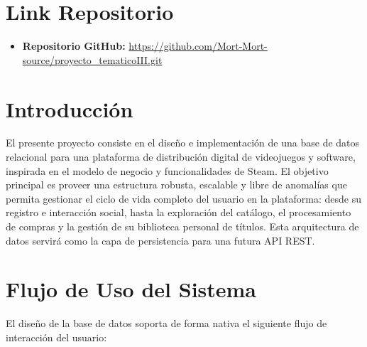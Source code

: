\documentclass[11pt,a4paper]{article}
\begin{document}

\section{Link Repositorio}

\begin{itemize}
    \item \textbf{Repositorio GitHub:} \url{https://github.com/Mort-Mort-source/proyecto_tematicoIII.git}
\end{itemize}

\section{Introducción}

El presente proyecto consiste en el diseño e implementación de una base de datos relacional para una plataforma de distribución digital de videojuegos y software, inspirada en el modelo de negocio y funcionalidades de Steam. El objetivo principal es proveer una estructura robusta, escalable y libre de anomalías que permita gestionar el ciclo de vida completo del usuario en la plataforma: desde su registro e interacción social, hasta la exploración del catálogo, el procesamiento de compras y la gestión de su biblioteca personal de títulos. Esta arquitectura de datos servirá como la capa de persistencia para una futura API REST.

\section{Flujo de Uso del Sistema}

El diseño de la base de datos soporta de forma nativa el siguiente flujo de interacción del usuario:
\end{document}
